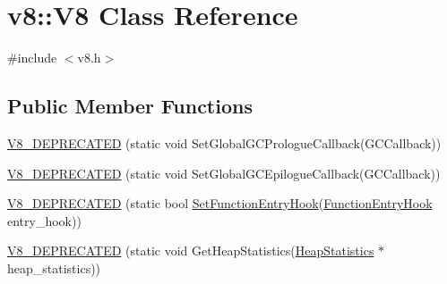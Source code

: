 \hypertarget{classv8_1_1_v8}{}\section{v8\+:\+:V8 Class Reference}
\label{classv8_1_1_v8}


{\ttfamily \#include $<$v8.\+h$>$}

\subsection*{Public Member Functions}
\begin{DoxyCompactItemize}
\item 
\hyperlink{classv8_1_1_v8_a2db298c4c02b6b1fb14997d97e918ab3}{V8\+\_\+\+D\+E\+P\+R\+E\+C\+A\+T\+E\+D} (static void Set\+Global\+G\+C\+Prologue\+Callback(G\+C\+Callback))
\item 
\hyperlink{classv8_1_1_v8_a3adcae2030e176ad13e4830e0939af5f}{V8\+\_\+\+D\+E\+P\+R\+E\+C\+A\+T\+E\+D} (static void Set\+Global\+G\+C\+Epilogue\+Callback(G\+C\+Callback))
\item 
\hyperlink{classv8_1_1_v8_aaed4a26e36f611fadb0ed5dca01bd578}{V8\+\_\+\+D\+E\+P\+R\+E\+C\+A\+T\+E\+D} (static bool \hyperlink{classv8_1_1_v8_a156ba8ae8d0e4112725ad2dd410e280d}{Set\+Function\+Entry\+Hook}(\hyperlink{namespacev8_aaf07fb6bb13f295da3c6568938b7dec5}{Function\+Entry\+Hook} entry\+\_\+hook))
\item 
\hyperlink{classv8_1_1_v8_acc6dfa7e89246205e5e82ade6b513be1}{V8\+\_\+\+D\+E\+P\+R\+E\+C\+A\+T\+E\+D} (static void Get\+Heap\+Statistics(\hyperlink{classv8_1_1_heap_statistics}{Heap\+Statistics} $\ast$heap\+\_\+statistics))
\end{DoxyCompactItemize}
